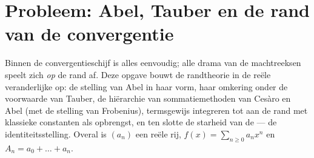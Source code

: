 \section{Probleem: Abel, Tauber en de rand van de convergentie}

\begin{problem}\label{pb:b2:powerseries:1}
Binnen de convergentieschijf is alles eenvoudig; alle drama van de
machtreeksen speelt zich \emph{op} de rand af. Deze opgave bouwt de
randtheorie in de reële veranderlijke op: de stelling van Abel in
haar  vorm, haar omkering onder de voorwaarde van Tauber,
de hiërarchie van sommatiemethoden van Cesàro en Abel (met de
stelling van Frobenius), termsgewijs integreren tot aan de rand met
klassieke constanten als opbrengst, en ten slotte de starheid van
de  --- de identiteitsstelling. Overal is $(a_n)$ een reële
rij, $f(x) = \sum_{n\geq0} a_nx^n$ en $A_n = a_0 + \dots + a_n$.


\end{problem}
